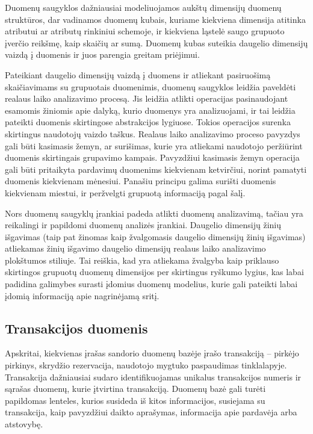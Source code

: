 Duomenų saugyklos dažniausiai modeliuojamos aukštų dimensijų duomenų struktūros, dar vadinamos duomenų kubais, kuriame kiekviena dimensija atitinka atributui ar atributų rinkiniui schemoje, ir kiekviena ląstelė saugo grupuoto įverčio reikšmę, kaip skaičių ar sumą. Duomenų kubas suteikia daugelio dimensijų vaizdą į duomenis ir juos parengia greitam priėjimui.

Pateikiant daugelio dimensijų vaizdą į duomens ir atliekant pasiruošimą skaičiavimams su grupuotais duomenimis, duomenų saugyklos leidžia paveldėti realaus laiko analizavimo procesą. 
Jis leidžia atlikti operacijas pasinaudojant esamomis žiniomis apie dalyką, kurio duomenys yra analizuojami, ir tai leidžia pateikti duomenis skirtingose abstrakcijos lygiuose.
Tokios operacijos surenka skirtingus naudotojų vaizdo taškus.
Realaus laiko analizavimo proceso pavyzdys gali būti kasimasis žemyn, ar surišimas, kurie yra atliekami naudotojo peržiūrint duomenis skirtingais grupavimo kampais.
Pavyzdžiui kasimasis žemyn operacija gali būti pritaikyta pardavimų duomenims kiekvienam ketvirčiui, norint pamatyti duomenis kiekvienam mėnesiui.
Panašiu principu galima surišti duomenis kiekvienam miestui, ir peržvelgti grupuotą informaciją pagal šalį.

Nors duomenų saugyklų įrankiai padeda atlikti duomenų analizavimą, tačiau yra reikalingi ir papildomi duomenų analizės įrankiai.
Daugelio dimensijų žinių išgavimas (taip pat žinomas kaip žvalgomasis daugelio dimensijų žinių išgavimas) atliekamas žinių išgavimo daugelio dimensijų realaus laiko analizavimo plokštumos stiliuje.
Tai reiškia, kad yra atliekama žvalgyba kaip priklauso skirtingos grupuotų duomenų dimensijos per skirtingus ryškumo lygius, kas labai padidina galimybes surasti įdomius duomenų modelius, kurie gali pateikti labai įdomią informaciją apie nagrinėjamą sritį.

\subsection{Transakcijos duomenis}

Apskritai, kiekvienas įrašas sandorio duomenų bazėje įrašo transakciją -- pirkėjo pirkinys, skrydžio rezervacija, naudotojo mygtuko paspaudimas tinklalapyje.
Transakcija dažniausiai sudaro identifikuojamas unikalus transakcijos numeris ir sąrašas duomenų, kurie įtvirtina transakciją.
Duomenų bazė gali turėti papildomas lenteles, kurios susideda iš kitos informacijos, susiejama su transakcija, kaip pavyzdžiui daikto aprašymas, informacija apie pardavėja arba atstovybę.

